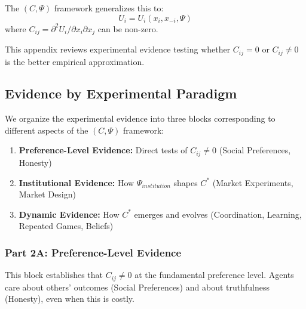 The $(C, \Psi)$ framework generalizes this to:
\begin{equation}
U_i = U_i(x_i, x_{-i}, \Psi)
\end{equation}
where $C_{ij} = \partial^2 U_i / \partial x_i \partial x_j$ can be non-zero.

This appendix reviews experimental evidence testing whether $C_{ij} = 0$ or
$C_{ij} \neq 0$ is the better empirical approximation.


\subsection{Evidence by Experimental Paradigm}

We organize the experimental evidence into three blocks corresponding to
different aspects of the $(C, \Psi)$ framework:

\begin{enumerate}[nosep]
    \item \textbf{Preference-Level Evidence:} Direct tests of $C_{ij} \neq 0$
          (Social Preferences, Honesty)
    \item \textbf{Institutional Evidence:} How $\Psi_{institution}$ shapes $C^*$
          (Market Experiments, Market Design)
    \item \textbf{Dynamic Evidence:} How $C^*$ emerges and evolves
          (Coordination, Learning, Repeated Games, Beliefs)
\end{enumerate}


\subsubsection*{Part 2A: Preference-Level Evidence}

This block establishes that $C_{ij} \neq 0$ at the fundamental preference level.
Agents care about others' outcomes (Social Preferences) and about truthfulness
(Honesty), even when this is costly.


